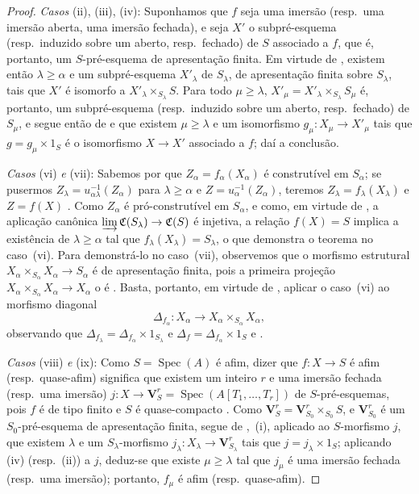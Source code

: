 \begin{proof}
\emph{Casos} (ii), (iii), (iv): Suponhamos que $f$ seja uma imersão (resp.\ uma imersão aberta, uma imersão fechada), e seja $X'$ o subpré-esquema (resp.\ induzido sobre um aberto, resp.\ fechado) de $S$ associado a $f$, que é, portanto, um $S$-pré-esquema de apresentação finita.
Em virtude de , existem então $\lambda\geqslant\alpha$ e um subpré-esquema $X'_\lambda$ de $S_\lambda$, de apresentação finita sobre $S_\lambda$, tais que $X'$ é isomorfo a $X'_\lambda\times_{S_\lambda}S$.
Para todo $\mu\geqslant\lambda$, $X'_\mu=X'_\lambda\times_{S_\lambda}S_\mu$ é, portanto, um subpré-esquema (resp.\ induzido sobre um aberto, resp.\ fechado) de $S_\mu$, e segue então de  e  que existem $\mu\geqslant\lambda$ e um isomorfismo $g_\mu:X_\mu\to X'_\mu$ tais que $g=g_\mu\times 1_S$ é o isomorfismo $X\to X'$ associado a $f$; daí a conclusão.

\emph{Casos} (vi) \emph{e} (vii): Sabemos por  que $Z_\alpha=f_\alpha(X_\alpha)$ é construtível em $S_\alpha$; se pusermos $Z_\lambda=u_{\alpha\lambda}^{-1}(Z_\alpha)$ para $\lambda\geqslant\alpha$ e $Z=u_\alpha^{-1}(Z_\alpha)$, teremos $Z_\lambda=f_\lambda(X_\lambda)$ e $Z=f(X)$ .
Como $Z_\alpha$ é pró-construtível em $S_\alpha$, e como, em virtude de , a aplicação canônica $\varinjlim\mathfrak{C}(S_\lambda)\to\mathfrak{C}(S)$ é injetiva, a relação $f(X)=S$ implica a existência de $\lambda\geqslant\alpha$ tal que $f_\lambda(X_\lambda)=S_\lambda$, o que demonstra o teorema no caso~(vi).
Para demonstrá-lo no caso~(vii), observemos que o morfismo estrutural $X_\alpha\times_{S_\alpha}X_\alpha\to S_\alpha$ é de apresentação finita, pois a primeira projeção $X_\alpha\times_{S_\alpha}X_\alpha\to X_\alpha$ o é . Basta, portanto, em virtude de , aplicar o caso~(vi) ao morfismo diagonal
\[
  \Delta_{f_\alpha}:X_\alpha\longrightarrow X_\alpha\times_{S_\alpha}X_\alpha,
\]
observando que $\Delta_{f_\lambda}=\Delta_{f_\alpha}\times1_{S_\lambda}$ e $\Delta_f=\Delta_{f_\alpha}\times1_S$  e .

\emph{Casos} (viii) \emph{e} (ix): Como $S=\operatorname{Spec}(A)$ é afim, dizer que $f:X\to S$ é afim (resp.\ quase-afim) significa que existem um inteiro $r$ e uma imersão fechada (resp.\ uma imersão) $j:X\to\mathbf{V}^r_S=\operatorname{Spec}(A[T_1,\ldots,T_r])$ de $S$-pré-esquemas, pois $f$ é de tipo finito e $S$ é quase-compacto .
Como $\mathbf{V}^r_S=\mathbf{V}^r_{S_0}\times_{S_0}S$, e $\mathbf{V}^r_{S_0}$ é um $S_0$-pré-esquema de apresentação finita, segue de ,~(i), aplicado ao $S$-morfismo $j$, que existem $\lambda$ e um $S_\lambda$-morfismo $j_\lambda:X_\lambda\to\mathbf{V}^r_{S_\lambda}$ tais que $j=j_\lambda\times 1_S$; aplicando (iv) (resp.\ (ii)) a $j$, deduz-se que existe $\mu\geqslant\lambda$ tal que $j_\mu$ é uma imersão fechada (resp.\ uma imersão); portanto, $f_\mu$ é afim (resp.\ quase-afim).


\end{proof}
